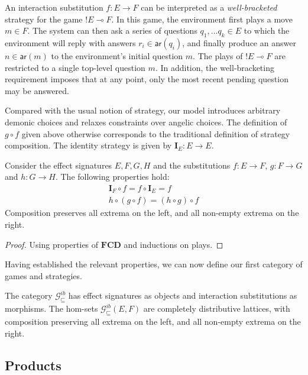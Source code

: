 \documentclass[sigplan,screen]{acmart}
\newcommand{\gcat}{\mathcal{G}_{\sqsubseteq}}
\newcommand{\kw}[1]{\ensuremath{ \mathsf{#1} }}
\begin{document}
An interaction substitution $f : E \rightarrow F$
can be interpreted as a \emph{well-bracketed} strategy for the game
${!E} \multimap F$.
In this game,
the environment first plays a move $m \in F$.
The system can then ask a series of questions
$q_1, \ldots q_k \in E$
to which the environment will reply with
answers $r_i \in \kw{ar}(q_i)$,
and finally produce an answer $n \in \kw{ar}(m)$
to the environment's initial question $m$.
The plays of ${!E} \multimap F$
are restricted to a single top-level question $m$.
In addition, the well-bracketing requirement
imposes that at any point,
only the most recent pending question
may be answered.

Compared with the usual notion of strategy,
our model introduces arbitrary demonic choices and
relaxes constraints over angelic choices.
The definition of $g \circ f$ given above
otherwise corresponds to the traditional
definition of strategy composition.
The identity strategy is given by $\mathbf{I}_E : E \rightarrow E$.

\begin{lemma}
Consider the effect signatures $E, F, G, H$ and
the substitutions
$f : E \rightarrow F$,
$g : F \rightarrow G$ and
$h : G \rightarrow H$.
The following properties hold:
\begin{gather*}
  \mathbf{I}_F \circ f = f \circ \mathbf{I}_E = f \\
  h \circ (g \circ f) = (h \circ g) \circ f
\end{gather*}
Composition preserves all extrema on the left,
and all non-empty extrema on the right.
\begin{proof}
Using properties of $\mathbf{FCD}$
and inductions on plays.
\end{proof}
\end{lemma}

Having established the relevant properties,
we can now define our first category of games and strategies.

\begin{definition}
The category $\gcat^{ib}$ has effect signatures as objects
and interaction substitutions as morphisms.
The hom-sets $\gcat^{ib}(E, F)$
are completely distributive lattices,
with composition preserving all extrema on the left,
and all non-empty extrema on the right.
\end{definition}


\subsection{Products} %
\end{document}
